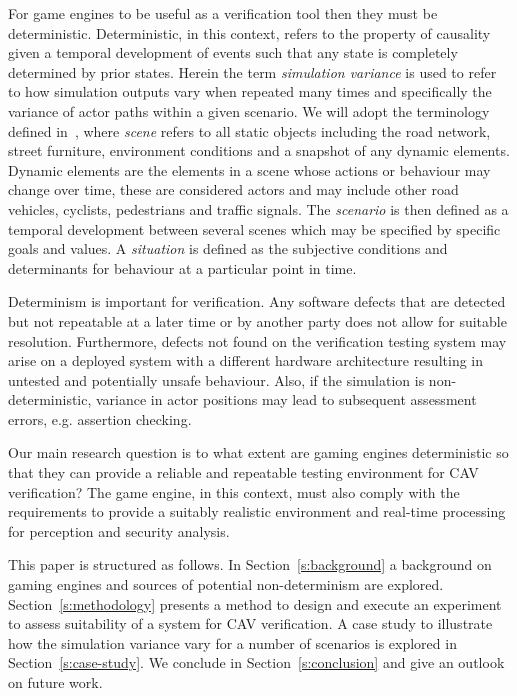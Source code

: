 \documentclass[letterpaper, 10 pt, journal, twoside]{IEEEtran}
\begin{document}
For game engines to be useful as a verification tool then they must be deterministic. 
%
Deterministic, in this context, refers to the property of causality given a temporal development of events such that any state is completely determined by prior states.
%
Herein the term \textit{simulation variance} is used to refer to how simulation outputs vary when repeated many times and specifically the variance of actor paths within a given scenario. We will adopt the terminology defined in~\cite{Ulbrich2015}, where \textit{scene} refers to all static objects including the road network, street furniture, environment conditions and a snapshot of any dynamic elements. Dynamic elements are the elements in a scene whose actions or behaviour may change over time, these are considered actors and may include other road vehicles, cyclists, pedestrians and traffic signals. The \textit{scenario} is then defined as a temporal development between several scenes which may be specified by specific goals and values. A \textit{situation} is defined as the subjective conditions and determinants for behaviour at a particular point in time.

Determinism is important for verification. Any software defects that are detected but not repeatable at a later time or by another party does not allow for suitable resolution. Furthermore, defects not found on the verification testing system may arise on a deployed system with a different hardware architecture resulting in untested and potentially unsafe behaviour. %
%
Also, if the simulation is non-deterministic, variance in actor positions may lead to subsequent assessment errors, e.g. assertion checking.

Our main research question is to what extent are gaming engines deterministic so that they can provide a reliable and repeatable testing environment for CAV verification? The game engine, in this context, must also comply with the requirements to provide a suitably realistic environment and real-time processing for perception and security analysis.

This paper is structured as follows. In Section~\ref{s:background} a background on gaming engines and sources of potential non-determinism are explored. Section~\ref{s:methodology} presents a method to design and execute an experiment to assess suitability of a system for CAV verification. A case study to illustrate how the simulation variance vary for a number of scenarios is explored in Section~\ref{s:case-study}. We conclude in Section~\ref{s:conclusion} and give an outlook on future work.
\end{document}
